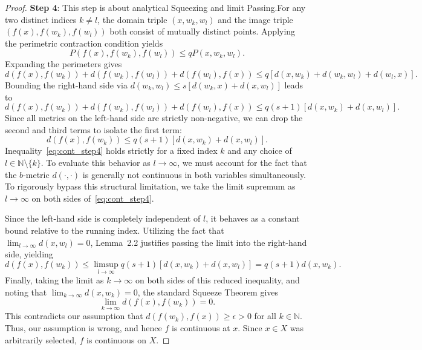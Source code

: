 \documentclass[10pt,a4paper]{amsart}
\begin{document}
\begin{proof}
\textbf{Step 4}: This step is about analytical Squeezing and limit Passing.\newline For any two distinct indices $k \neq l$, the domain triple $(x, w_k, w_l)$ and the image triple $(f(x), f(w_k), f(w_l))$ both consist of mutually distinct points. Applying the perimetric contraction condition yields
\[
P(f(x),f(w_k),f(w_l))\leq qP(x,w_k,w_l).
\]
Expanding the perimeters gives
\[
d(f(x),f(w_k)) + d(f(w_k),f(w_l)) + d(f(w_l),f(x))\leq q[d(x,w_k) + d(w_k,w_l) + d(w_l,x)].
\]
Bounding the right-hand side via $d(w_k, w_l) \leq s[d(w_k, x) + d(x, w_l)]$ leads to
\[
d(f(x),f(w_k)) + d(f(w_k),f(w_l)) + d(f(w_l),f(x))\leq q(s + 1)[d(x,w_k) + d(x,w_l)].
\]
Since all metrics on the left-hand side are strictly non-negative, we can drop the second and third terms to isolate the first term:
\begin{equation}
d(f(x),f(w_k))\leq q(s + 1)[d(x,w_k) + d(x,w_l)].
\label{eq:cont_step4}
\end{equation}
Inequality~\eqref{eq:cont_step4} holds strictly for a fixed index $k$ and any choice of $l \in \mathbb{N} \setminus \{k\}$. To evaluate this behavior as $l \to \infty$, we must account for the fact that the $b$-metric $d(\cdot, \cdot)$ is generally not continuous in both variables simultaneously. To rigorously bypass this structural limitation, we take the limit supremum as $l \to \infty$ on both sides of~\eqref{eq:cont_step4}. 

Since the left-hand side is completely independent of $l$, it behaves as a constant bound relative to the running index. Utilizing the fact that $\lim_{l \to \infty} d(x, w_l) = 0$, Lemma~2.2 justifies passing the limit into the right-hand side, yielding
\[
d(f(x), f(w_k)) \le \limsup_{l \to \infty} q(s + 1) \left[ d(x, w_k) + d(x, w_l) \right] = q(s + 1) d(x, w_k).
\]
Finally, taking the limit as $k \to \infty$ on both sides of this reduced inequality, and noting that $\lim_{k \to \infty} d(x, w_k) = 0$, the standard Squeeze Theorem gives 
\[
\lim_{k \to \infty} d(f(x), f(w_k)) = 0.
\]
This contradicts our  assumption that $d(f(w_k), f(x)) \ge \epsilon > 0$ for all $k \in \mathbb{N}$. Thus, our assumption is wrong, and hence $f$ is continuous at $x$. Since $x \in X$ was arbitrarily selected, $f$ is continuous on $X$.
\end{proof}
\end{document}
